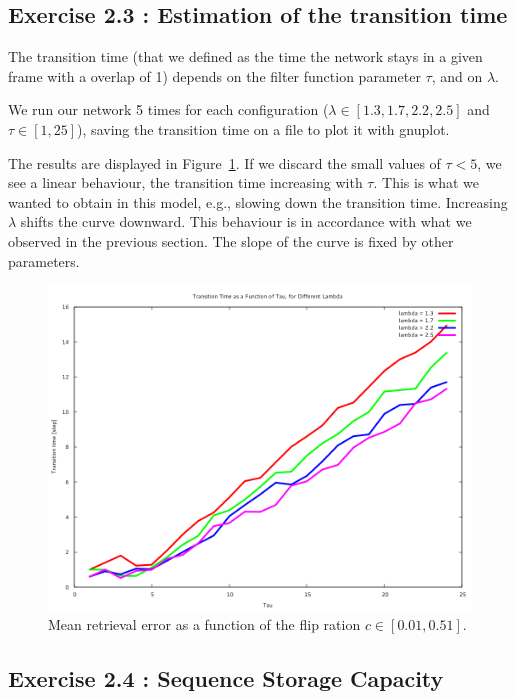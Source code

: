 \subsection{Exercise 2.3 : Estimation of the transition time}
The transition time (that we defined as the time the network stays in a given frame with a overlap of 1) depends on the filter function parameter $\tau$, and on $\lambda$.

We run our network 5 times for each configuration ($\lambda \in [1.3, 1.7, 2.2, 2.5]$ and 
$\tau \in [1, 25]$), saving the transition time on a file to plot it with gnuplot. 

The results
are displayed in Figure~\ref{transtime}. If we discard the small values of $\tau < 5$, we
see a linear behaviour, the transition time increasing with $\tau$. This is what we wanted to obtain in this model, e.g., slowing down the transition time. Increasing $\lambda$ shifts the curve downward. This behaviour is in accordance with what we observed in the previous section.  
The slope of the curve is fixed by other parameters.
\begin{figure}\label{transtime}
    \begin{center}
    \caption{Mean retrieval error as a function of the flip ration $c\in[0.01, 0.51]$.  }
    \includegraphics[scale=0.5]{img/ex23.png}
    \end{center}
\end{figure}


\subsection{Exercise 2.4 : Sequence Storage Capacity}

